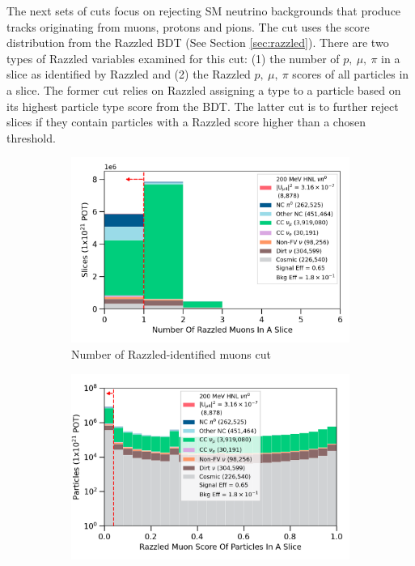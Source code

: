 The next sets of cuts focus on rejecting SM neutrino backgrounds that produce tracks originating from muons, protons and pions.
The cut uses the score distribution from the Razzled BDT (See Section \ref{sec:razzled}).
There are two types of Razzled variables examined for this cut: (1) the number of $p, \ \mu, \ \pi$ in a slice as identified by Razzled and (2) the Razzled $p, \ \mu, \ \pi$ scores of all particles in a slice.
The former cut relies on Razzled assigning a type to a particle based on its highest particle type score from the BDT.
The latter cut is to further reject slices if they contain particles with a Razzled score higher than a chosen threshold.

\begin{figure}[b!]
        \begin{subfigure}[b]{0.495\textwidth}   
            \centering 
            \includegraphics[width=\textwidth]{nrazzled_muon_precut}
            \caption{Number of Razzled-identified muons cut}%
            \label{fig:nrazzled_muon_full}
        \end{subfigure}
        \hfill
        \begin{subfigure}[b]{0.495\textwidth}   
            \centering 
            \includegraphics[width=\textwidth]{razzled_muon_score_precut}

\end{subfigure}
\end{figure}
